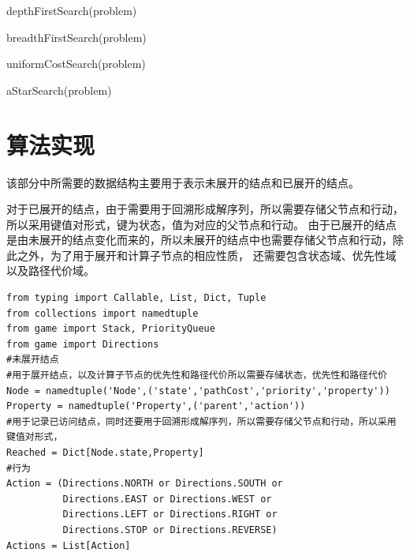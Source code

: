 \begin{algorithm}[H]
    \caption{depthFirstSearch(problem)}
\end{algorithm}

\begin{algorithm}[H]
    \caption{breadthFirstSearch(problem)}
\end{algorithm}

\begin{algorithm}[H]
    \caption{uniformCostSearch(problem)}
\end{algorithm}

\begin{algorithm}[H]
    \caption{aStarSearch(problem)}
\end{algorithm}
%
%

\section{算法实现}
%
%
该部分中所需要的数据结构主要用于表示未展开的结点和已展开的结点。

对于已展开的结点，由于需要用于回溯形成解序列，所以需要存储父节点和行动，所以采用键值对形式，键为状态，值为对应的父节点和行动。
由于已展开的结点是由未展开的结点变化而来的，所以未展开的结点中也需要存储父节点和行动，除此之外，为了用于展开和计算子节点的相应性质，
还需要包含状态域、优先性域以及路径代价域。

\begin{lstlisting}
from typing import Callable, List, Dict, Tuple
from collections import namedtuple
from game import Stack, PriorityQueue
from game import Directions
#未展开结点
#用于展开结点，以及计算子节点的优先性和路径代价所以需要存储状态，优先性和路径代价
Node = namedtuple('Node',('state','pathCost','priority','property'))
Property = namedtuple('Property',('parent','action'))
#用于记录已访问结点，同时还要用于回溯形成解序列，所以需要存储父节点和行动，所以采用键值对形式，
Reached = Dict[Node.state,Property]
#行为
Action = (Directions.NORTH or Directions.SOUTH or
          Directions.EAST or Directions.WEST or
          Directions.LEFT or Directions.RIGHT or
          Directions.STOP or Directions.REVERSE)
Actions = List[Action]
\end{lstlisting}

